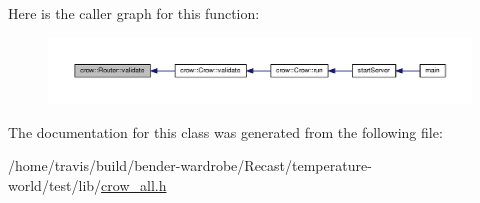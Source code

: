 Here is the caller graph for this function\-:
\nopagebreak
\begin{figure}[H]
\begin{center}
\leavevmode
\includegraphics[width=350pt]{classcrow_1_1_router_a7916aa9620d6c6af2389af0d877ea9d9_icgraph}
\end{center}
\end{figure}




The documentation for this class was generated from the following file\-:\begin{DoxyCompactItemize}
\item 
/home/travis/build/bender-\/wardrobe/\-Recast/temperature-\/world/test/lib/\hyperlink{crow__all_8h}{crow\-\_\-all.\-h}\end{DoxyCompactItemize}

